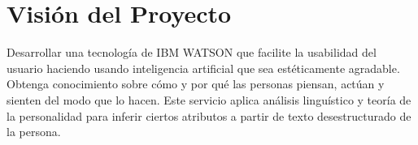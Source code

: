 \chapter{Visión del Proyecto}
Desarrollar una tecnología de IBM WATSON que facilite la usabilidad del
usuario haciendo usando inteligencia artificial que sea estéticamente agradable.
Obtenga conocimiento sobre cómo y por qué las personas piensan, actúan
y sienten del modo que lo hacen. Este servicio aplica análisis linguístico
y teoría de la personalidad para inferir ciertos atributos a partir de texto
desestructurado de la persona.